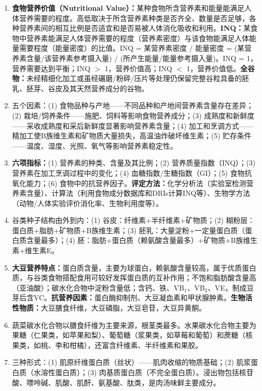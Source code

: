 {\begin{enumerate}[leftmargin=*, itemsep=5pt]
    \item \textbf{食物营养价值（Nutritional Value）：}某种食物所含营养素和能量能满足人体营养需要的程度。高低取决于所含营养素种类是否齐全、数量是否足够，各种营养素间的相互比例是否适宜和是否易被人体消化吸收和利用。\textbf{INQ：}某食物中营养素能满足人体营养需要的程度（营养素密度）与该食物能满足人体能量需要程度（能量密度）的比值。INQ = 某营养素密度 / 能量密度 = (某营养素含量/该营养素参考摄入量) / (所产生能量/能量参考摄入量)。INQ = 1，营养需要达到平衡；INQ $>$ 1，营养价值高；INQ $<$ 1，营养价值低。\textbf{全谷物：}未经精细化加工或虽经碾磨/粉碎/压片等处理仍保留完整谷粒具备的胚乳、胚芽、谷皮及其天然营养成分的谷物。
    \item 五个因素：(1) 食物品种与产地——不同品种和产地间营养素含量存在差异；(2) 栽培/饲养条件——施肥、饲料等影响食物营养成分；(3) 成熟度和新鲜度——采收成熟度和采后新鲜度显著影响营养素含量；(4) 加工和烹调方式——精加工使B族维生素和矿物质大量损失，高温油炸破坏维生素；(5) 贮存条件——温度、湿度、光照、氧气等影响营养素稳定性。
    \item \textbf{六项指标：}(1) 营养素的种类、含量及其比例；(2) 营养质量指数（INQ）；(3) 营养素在加工烹调过程中的变化；(4) 血糖指数/生糖指数（GI）；(5) 食物抗氧化能力；(6) 食物中的抗营养因子。\textbf{评定方法：}化学分析法（实验室检测营养素含量）、计算法（利用食物成分数据库和DRIs计算INQ等）、生物学方法（动物/人体实验评价消化率、生物利用度等）。
    \item 谷类种子结构由外到内：(1) 谷皮：纤维素+半纤维素+矿物质；(2) 糊粉层：蛋白质+脂肪+矿物质+B族维生素；(3) 胚乳：大量淀粉+一定量蛋白质（蛋白质含量最多）；(4) 胚：脂肪+蛋白质（赖氨酸含量最多）+矿物质+B族维生素+维生素E。
    \item \textbf{大豆营养特点：}蛋白质含量，主要为球蛋白，赖氨酸含量较高，属于优质蛋白质，与谷类食物搭配食用可较好发挥蛋白质的互补作用；不饱和脂肪酸含量高（亚油酸）；碳水化合物中淀粉含量低；含钙、铁、VB$_1$、VB$_2$、VE，制成豆芽后含VC。\textbf{抗营养因素：}蛋白酶抑制剂、大豆凝血素和甲状腺肿素。\textbf{生物活性物质：}大豆膳食纤维，大豆磷脂，大豆皂苷，大豆异黄酮。
    \item 蔬菜碳水化合物以膳食纤维为主要来源，根茎类最多。水果碳水化合物主要为果糖（仁果类，如苹果和梨）、葡萄糖（浆果类，如草莓和葡萄）和蔗糖（核果类，如桃、李和柑橘），还富含纤维素、半纤维素和果胶。
    \item 三种形式：(1) 肌原纤维蛋白质（丝状）——肌肉收缩的物质基础；(2) 肌浆蛋白质（水溶性蛋白质）；(3) 肉基质蛋白质（不完全蛋白质）。浸出物包括核苷酸、嘌呤碱、肌酸、肌酐、氨基酸、肽类，是肉汤味鲜主要成分。

\end{enumerate}}
